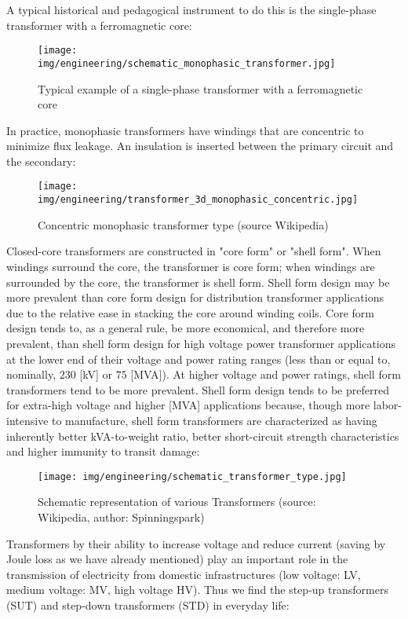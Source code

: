 	A typical historical and pedagogical instrument to do this is the single-phase transformer with a ferromagnetic core:
	\begin{figure}[H]
		\centering
		\texttt{[image: img/engineering/schematic\_monophasic\_transformer.jpg]}
		\caption{Typical example of a single-phase transformer with a ferromagnetic core}
	\end{figure}
	In practice, monophasic transformers have windings that are concentric to minimize flux leakage. An insulation is inserted between the primary circuit and the secondary:
	\begin{figure}[H]
		\centering
		\texttt{[image: img/engineering/transformer\_3d\_monophasic\_concentric.jpg]}
		\caption[Concentric monophasic transformer type]{Concentric monophasic transformer type (source Wikipedia)}
	\end{figure}
	Closed-core transformers are constructed in "core form" or "shell form". When windings surround the core, the transformer is core form; when windings are surrounded by the core, the transformer is shell form. Shell form design may be more prevalent than core form design for distribution transformer applications due to the relative ease in stacking the core around winding coils. Core form design tends to, as a general rule, be more economical, and therefore more prevalent, than shell form design for high voltage power transformer applications at the lower end of their voltage and power rating ranges (less than or equal to, nominally, $230$ [kV] or $75$ [MVA]). At higher voltage and power ratings, shell form transformers tend to be more prevalent. Shell form design tends to be preferred for extra-high voltage and higher [MVA] applications because, though more labor-intensive to manufacture, shell form transformers are characterized as having inherently better kVA-to-weight ratio, better short-circuit strength characteristics and higher immunity to transit damage:
	\begin{figure}[H]
		\centering
		\texttt{[image: img/engineering/schematic\_transformer\_type.jpg]}
		\caption[Schematic representation of various Transformers]{Schematic representation of various Transformers (source: Wikipedia, author: Spinningspark)}
	\end{figure}
	Transformers by their ability to increase voltage and reduce current (saving by Joule loss as we have already mentioned) play an important role in the transmission of electricity from domestic infrastructures (low voltage: LV, medium voltage: MV, high voltage HV). Thus we find the step-up transformers (SUT) and step-down transformers (STD) in everyday life:
